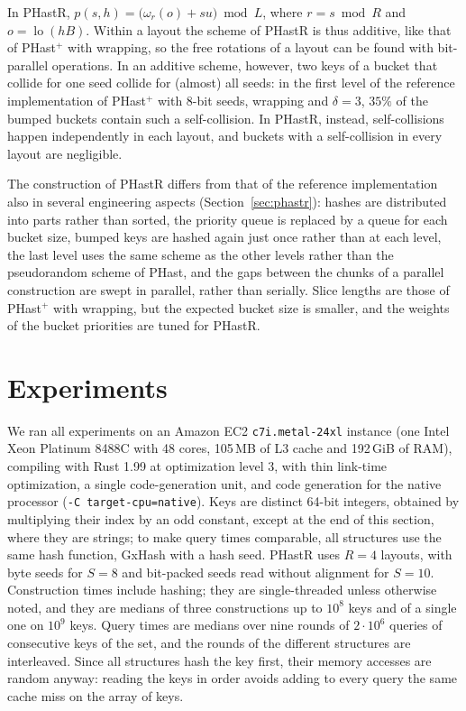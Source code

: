 \documentclass[11pt]{article}
\newcommand{\PHast}{PHast\xspace}
\newcommand{\PHastP}{PHast$^+$\xspace}
\newcommand{\PHastR}{PHastR\xspace}
\begin{document}
In \PHastR,
$p(s,h)=\bigl(\omega_r(o)+su\bigr)\bmod L$, where $r=s\bmod R$ and
$o=\operatorname{lo}(hB)$. Within a layout the scheme of \PHastR is thus
additive, like that of \PHastP with wrapping, so the free rotations of a
layout can be found with bit-parallel operations. In an additive scheme,
however, two keys of a bucket that collide for one seed collide for (almost)
all seeds: in the first level of the reference implementation of \PHastP with
8-bit seeds, wrapping and $\delta=3$, $35\%$ of the bumped buckets contain
such a self-collision. In \PHastR, instead, self-collisions happen
independently in each layout, and buckets with a self-collision in every
layout are negligible.

The construction of \PHastR differs from that of the reference implementation
also in several engineering aspects (Section~\ref{sec:phastr}): hashes are
distributed into parts rather than sorted, the priority queue is replaced by
a queue for each bucket size, bumped keys are hashed again just once rather
than at each level, the last level uses the same scheme as the other levels
rather than the pseudorandom scheme of \PHast, and the gaps between the
chunks of a parallel construction are swept in parallel, rather than serially. Slice lengths are those of \PHastP
with wrapping, but the expected bucket size is smaller, and the weights of
the bucket priorities are tuned for \PHastR.

\section{Experiments}
\label{sec:experiments}

We ran all experiments on an Amazon EC2 \texttt{c7i.metal-24xl} instance
(one Intel Xeon Platinum 8488C with 48 cores, 105\,MB of L3 cache and
192\,GiB of RAM), compiling with Rust 1.99 at optimization level 3, with thin
link-time optimization, a single code-generation unit, and code generation
for the native processor (\texttt{-C target-cpu=native}). Keys are distinct
64-bit integers, obtained by multiplying their index by an odd constant,
except at the end of this section, where they are strings; to make query times comparable, all
structures use the same hash function, GxHash with a hash seed. \PHastR uses
$R=4$ layouts, with byte seeds for $S=8$ and bit-packed seeds read without
alignment for $S=10$. Construction times include hashing; they are
single-threaded unless otherwise noted, and they are medians of three
constructions up to $10^8$ keys and of a single one on $10^9$ keys. Query
times are medians over nine rounds of $2\cdot10^6$ queries of consecutive
keys of the set, and the rounds of the different structures are interleaved.
Since all structures hash the key first, their memory accesses are random
anyway: reading the keys in order avoids adding to every query the same cache
miss on the array of keys.
\end{document}
